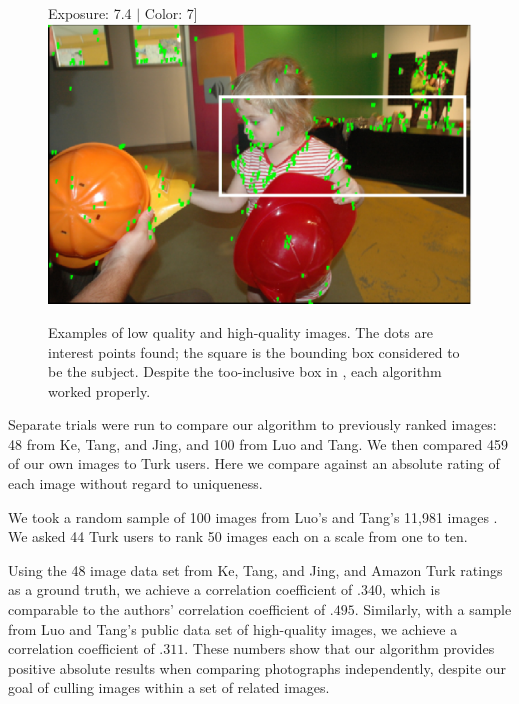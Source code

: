 \documentclass{article}
\begin{document}
\begin{figure}[t]
Exposure: 7.4 \(\mid\)
Color: 7]{
	\includegraphics[scale=.25]{example_good.eps}
	\label{example_good}
}
\caption{Examples of  low quality and  high-quality images. The dots are interest points found; the square is the bounding box considered to be the subject. Despite the too-inclusive box in , each algorithm worked properly.}
\label{fig:Examples}
\end{figure}

Separate trials were run to compare our algorithm to previously ranked images: 48 from Ke, Tang, and Jing\cite{1640788}, and 100 from Luo and Tang\cite{springerlink:10.1007/978-3-540-88690-7_29}. We then compared 459 of our own images to Turk users. Here we compare against an absolute rating of each image without regard to uniqueness.

We took a random sample of 100 images from Luo's and Tang's 11,981 images \cite{springerlink:10.1007/978-3-540-88690-7_29}. We asked 44 Turk users to rank 50 images each on a scale from one to ten.

Using the 48 image data set from Ke, Tang, and Jing\cite{1640788}, and Amazon Turk ratings as a ground truth, we achieve a correlation coefficient of \(.340\), which is comparable to the authors' correlation coefficient of \(.495\). Similarly, with a sample from Luo and Tang's public data set of high-quality images\cite{springerlink:10.1007/978-3-540-88690-7_29}, we achieve a correlation coefficient of \(.311\). These numbers show that our algorithm provides positive absolute results when comparing photographs independently, despite our goal of culling images within a set of related images.
\end{document}
